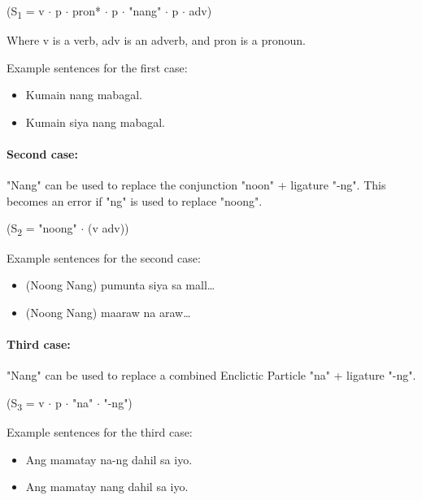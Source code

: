 \begin{center}
      (S\textsubscript{1} = v \(\cdot\) p \(\cdot\) pron* \(\cdot\) p \(\cdot\)
      "nang" \(\cdot\) p \(\cdot\) adv)
\end{center}

Where v is a verb, adv is an adverb, and pron is a pronoun.

\begin{example}
      Example sentences for the first case:
\end{example}
\begin{itemize}
      \item Kumain nang mabagal.
      \item             Kumain siya nang mabagal.

\end{itemize}

\paragraph{Second case:} "Nang" can be used to replace the conjunction "noon" +
ligature "-ng". This becomes an error if "ng" is used to replace "noong".

\begin{center}
      (S\textsubscript{2} = "noong" \(\cdot\) (v {\textpipe} adv))
\end{center}

\begin{example}
      Example sentences for the second case:
\end{example}

\begin{itemize}
      \item (Noong {\textpipe} Nang) pumunta siya sa mall…
      \item (Noong {\textpipe} Nang) maaraw na araw…
\end{itemize}

\paragraph{Third case:} "Nang" can be used to replace a combined Enclictic Particle
"na" + ligature "-ng".

\begin{center}
      (S\textsubscript{3} = v \(\cdot\) p \(\cdot\) "na" \(\cdot\) "-ng")
\end{center}

\begin{example}
      Example sentences for the third case:
\end{example}
\begin{itemize}
      \item Ang mamatay na-ng dahil sa iyo.
      \item Ang mamatay nang dahil sa iyo.
\end{itemize}

